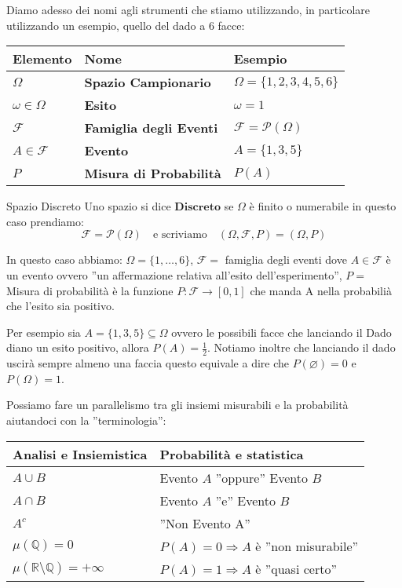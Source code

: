 \documentclass[11pt, a4paper, twoside]{article}
\begin{document}
Diamo adesso dei nomi agli strumenti che stiamo utilizzando, in particolare utilizzando un esempio, quello del dado a $6$ facce:

\begin{center}
	\begin{tabular}{|l|l|l|}
		\hline
		\textbf{Elemento} & \textbf{Nome} & \textbf{Esempio}\\
		\hline
		{$\Omega$} & \textbf{Spazio Campionario} & {$\Omega = \{1,2,3,4,5,6\}$}\\
		\hline
		{$\omega \in \Omega$} & \textbf{Esito} & {$\omega = 1$}\\
		\hline
		{$\mathcal F$} & \textbf{Famiglia degli Eventi} & {$\mathcal F = \mathcal P(\Omega)$}\\
		\hline
		{$A \in \mathcal F$} & \textbf{Evento} & {$A = \{1,3,5\}$}\\
		\hline
		{$P$} & \textbf{Misura di Probabilità} & {$P(A)$}\\
		\hline
	\end{tabular}
\end{center}


\begin{defn}{Spazio Discreto}{}
	Uno spazio si dice $\textbf{Discreto}$ se $\Omega$ è finito o numerabile in questo caso prendiamo:
	\[
		\mathcal F =\mathcal P(\Omega)\quad \text{e scriviamo}\quad (\Omega,\mathcal F, P)=(\Omega, P)
	\]
\end{defn}
\begin{es}
	In questo caso abbiamo: $\Omega=\{1,\dots,6\}$, $\mathcal F=$ famiglia degli eventi dove $A\in\mathcal F$ è un evento ovvero ''un affermazione relativa all'esito dell'esperimento'', $P=$ Misura di probabilità è la funzione $P:\mathcal F\rightarrow[0,1]$ che manda A nella probabilià che l'esito sia positivo.

Per esempio sia $A= \{1,3,5\}\subseteq \Omega$ ovvero le possibili facce che lanciando il Dado diano un esito positivo, allora $P(A)=\frac{1}{2}$. Notiamo inoltre che lanciando il dado uscirà sempre almeno una faccia questo equivale a dire che $P(\varnothing)=0$ e $P(\Omega)=1$.
\end{es}
\begin{oss}
	Possiamo fare un parallelismo tra gli insiemi misurabili e la probabilità aiutandoci con la ''terminologia'':
	\begin{center}
		\begin{tabular}{|l|l|}
			\hline
			\textbf{Analisi e Insiemistica} & \textbf{Probabilità e statistica}\\
			\hline
			{$A\cup B$} & {Evento $A$ ''oppure'' Evento $B$}\\
			\hline
			{$A\cap B$} & {Evento $A$ ''e'' Evento $B$}\\
			\hline
			{$A^c$} & {''Non Evento A''}\\
			\hline
			{$\mu(\mathbb{Q})=0$} & {$P(A)=0\Rightarrow A$ è ''non misurabile''}\\
			\hline
			{$\mu(\mathbb{R}\setminus\mathbb{Q})=+\infty$} & {$P(A)=1\Rightarrow A$ è ''quasi certo''}\\
			\hline
		\end{tabular}
	\end{center}
\end{oss}
\end{document}
